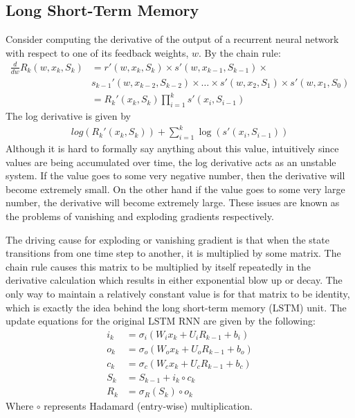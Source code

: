 \subsection{Long Short-Term Memory}
Consider computing the derivative of the output of a recurrent neural network with respect to one of its feedback weights, $w$.  By the chain rule:
\begin{align}\label{eq:rnn_deriv}
\frac{d}{dw}R_k(w,x_k,S_k) &= r'(w,x_k,S_k)\times s'(w,x_{k-1},S_{k-1})\times \nonumber
\\&s_{k-1}'(w,x_{k-2},S_{k-2})\times \dots
\times s'(w,x_2,S_1)\times s'(w,x_1,S_0)\\
&= R_k'(x_k,S_k)\prod_{i=1}^k s'(x_i,S_{i-1})
\end{align}
The log derivative is given by
\begin{align}
log(R_k'(x_k,S_k)) + \sum_{i=1}^k \log(s'(x_i,S_{i-1}))
\end{align}
Although it is hard to formally say anything about this value, intuitively since values are being accumulated over time, the log derivative acts as an unstable system.  If the value goes to some very negative number, then the derivative will become extremely small.  On the other hand if the value goes to some very large number, the derivative will become extremely large.  These issues are known as the problems of vanishing and exploding gradients respectively.

The driving cause for exploding or vanishing gradient is that when the state transitions from one time step to another, it is multiplied by some matrix.  The chain rule causes this matrix to be multiplied by itself repeatedly in the derivative calculation which results in either exponential blow up or decay.  The only way to maintain a relatively constant value is for that matrix to be identity, which is exactly the idea behind the long short-term memory (LSTM) unit. \cite{sh97} The update equations for the original LSTM RNN are given by the following:
\begin{align}\label{eq:lstm_start}
i_k &= \sigma_i(W_ix_k + U_iR_{k-1} + b_i)\\
o_k &= \sigma_o(W_ox_k + U_oR_{k-1} + b_o)\\
c_k &= \sigma_c(W_cx_k + U_cR_{k-1} + b_c)\\
S_k &= S_{k-1} + i_k \circ c_k\\
R_k &= \sigma_R(S_k) \circ o_k\label{eq:lstm_end}
\end{align}
Where $\circ$ represents Hadamard (entry-wise) multiplication.

